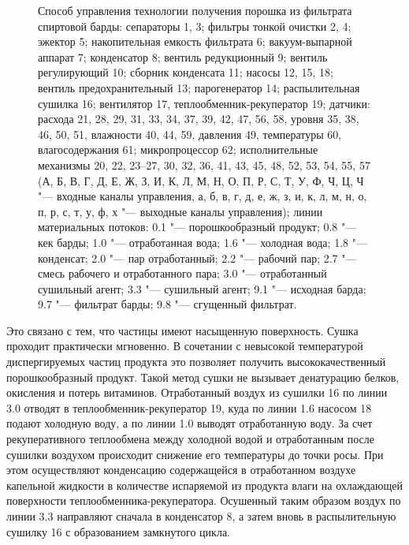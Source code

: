 \begin{figure} 
\center
\begin{scriptsize}
\def\svgwidth{0.816\linewidth}
\label{nomo2}
\end{scriptsize}
\caption[Способ управления технологии получения порошка из фильтрата спиртовой барды]{Способ управления технологии получения порошка из фильтрата спиртовой барды: сепараторы 1, 3; фильтры тонкой очистки 2, 4; эжектор 5; накопительная емкость фильтрата 6; вакуум-выпарной аппарат 7; конденсатор 8; вентиль редукционный 9; вентиль регулирующий 10; сборник конденсата 11; насосы 12, 15, 18; вентиль предохранительный 13; парогенератор 14; распылительная сушилка 16; вентилятор 17, теплообменник-рекуператор 19; датчики: расхода 21, 28, 29, 31, 33, 34, 37, 39, 42, 47, 56, 58, уровня 35, 38, 46, 50, 51, влажности 40, 44, 59, давления 49, температуры 60, влагосодержания 61; микропроцессор 62; исполнительные механизмы 20, 22, 23--27, 30, 32, 36, 41, 43, 45, 48, 52, 53, 54, 55, 57 (А, Б, В, Г, Д, Е, Ж, З, И, К, Л, М, Н, О, П, Р, С, Т, У, Ф, Ч, Ц, Ч "--- входные каналы управления, а, б, в, г, д, е, ж, з, и, к, л, м, н, о, п, р, с, т, у, ф, х "--- выходные каналы управления); линии материальных потоков: 0.1 "--- порошкообразный продукт; 0.8 "--- кек барды; 1.0 "--- отработанная вода; 1.6 "--- холодная вода; 1.8 "--- конденсат; 2.0 "--- пар отработанный; 2.2 "--- рабочий пар; 2.7 "--- смесь рабочего и отработанного пара; 3.0 "--- отработанный сушильный агент; 3.3 "--- сушильный агент; 9.1 "--- исходная барда; 9.7 "--- фильтрат барды; 9.8 "--- сгущенный фильтрат.}
\end{figure}
Это связано с тем, что частицы имеют насыщенную поверхность. Сушка проходит практически мгновенно. 
В сочетании с невысокой температурой диспергируемых частиц продукта это позволяет получить высококачественный порошкообразный продукт. 
Такой метод сушки не вызывает денатурацию белков, окисления и потерь витаминов. 
Отработанный воздух из сушилки 16 по линии 3.0 отводят в теплообменник-рекуператор 19, куда по линии 1.6 насосом 18 подают холодную воду, а по линии 1.0 выводят отработанную воду. 
За счет рекуперативного теплообмена между холодной водой и отработанным после сушилки воздухом происходит снижение его температуры до точки росы. 
При этом осуществляют конденсацию содержащейся в отработанном воздухе капельной жидкости в количестве испаряемой из продукта влаги на охлаждающей поверхности теплообменника-рекуператора. 
Осушенный таким образом воздух по линии 3.3 направляют сначала в конденсатор 8, а затем вновь в распылительную сушилку 16 с образованием замкнутого цикла.
